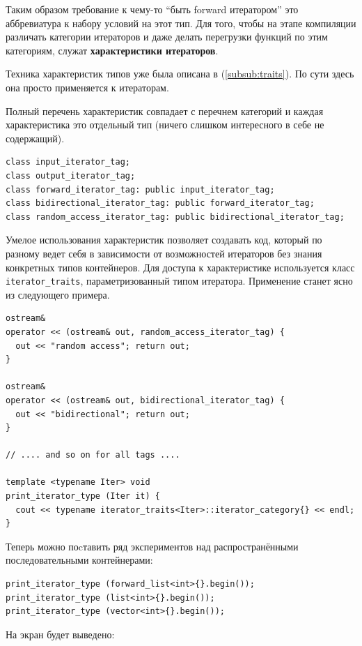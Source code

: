 \documentclass[a4paper,12pt,oneside]{article}
\begin{document}
Таким образом требование к чему-то ``быть forward итератором'' это аббревиатура к набору условий на этот тип. Для того, чтобы на этапе компиляции различать категории итераторов и даже делать перегрузки функций по этим категориям, служат \textbf{характеристики итераторов}. 

Техника характеристик типов уже была описана в (\ref{subsub:traits}). По сути здесь она просто применяется к итераторам.

Полный перечень характеристик совпадает с перечнем категорий и каждая характеристика это отдельный тип (ничего слишком интересного в себе не содержащий).

\begin{lstlisting}
class input_iterator_tag;
class output_iterator_tag;
class forward_iterator_tag: public input_iterator_tag;
class bidirectional_iterator_tag: public forward_iterator_tag;
class random_access_iterator_tag: public bidirectional_iterator_tag;
\end{lstlisting}

Умелое использования характеристик позволяет создавать код, который по разному ведет себя в зависимости от возможностей итераторов без знания конкретных типов контейнеров. Для доступа к характеристике используется класс \lstinline!iterator_traits!, параметризованный типом итератора. Применение станет ясно из следующего примера.

\begin{lstlisting}
ostream& 
operator << (ostream& out, random_access_iterator_tag) { 
  out << "random access"; return out; 
}

ostream& 
operator << (ostream& out, bidirectional_iterator_tag) { 
  out << "bidirectional"; return out; 
}

// .... and so on for all tags ....

template <typename Iter> void 
print_iterator_type (Iter it) {
  cout << typename iterator_traits<Iter>::iterator_category{} << endl;
}
\end{lstlisting}

Теперь можно поcтавить ряд экспериментов над распространёнными последовательными контейнерами:

\begin{lstlisting}
print_iterator_type (forward_list<int>{}.begin()); 
print_iterator_type (list<int>{}.begin());
print_iterator_type (vector<int>{}.begin());
\end{lstlisting}

На экран будет выведено:
\end{document}
